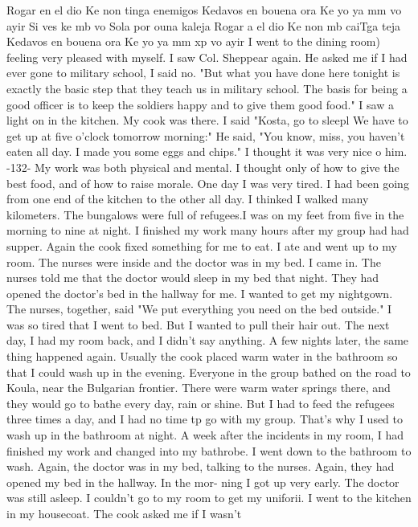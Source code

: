 Rogar en el dio 
Ke non tinga enemigos 
Kedavos en bouena ora 
Ke yo ya mm vo ayir 
Si ves ke mb vo 
Sola por ouna kaleja 
Rogar a el dio 
Ke non mb caiTga teja 
Kedavos en bouena ora 
Ke yo ya mm xp vo ayir 
I went to the dining room) feeling very pleased with myself.
I saw Col.
Sheppear 
again.
He asked me if I had ever gone to military school, I said no.
"But what you 
have done here tonight is exactly the basic step that they teach us in military 
school.
The basis for being a good officer is to keep the soldiers happy and to give 
them good food."
I saw a light on in the kitchen.
My cook was there.
I said "Kosta, go to sleepl 
We have to get up at five o'clock tomorrow morning:" He said, "You know, miss, you 
haven't eaten all day.
I made you some eggs and chips."
I thought it was very nice o 
him.
-132- 
My work was both physical and mental.
I thought only of how to give the best 
food, and of how to raise morale.
One day I was very tired.
I had been going from 
one end of the kitchen to the other all day.
I thinked I walked many kilometers.
The bungalows were full of refugees.I was on my feet from five in the morning to 
nine at night.
I finished my work many hours after my group had had supper.
Again 
the cook fixed something for me to eat.
I ate and went up to my room.
The nurses 
were inside and the doctor was in my bed.
I came in.
The nurses told me that the 
doctor would sleep in my bed that night.
They had opened the doctor's bed in the 
hallway for me.
I wanted to get my nightgown.
The nurses, together, said "We put everything you 
need on the bed outside."
I was so tired that I went to bed.
But I wanted to pull 
their hair out.
The next day, I had my room back, and I didn't say anything.
A few 
nights later, the same thing happened again.
Usually the cook placed warm water in the bathroom so that I could wash up in 
the evening.
Everyone in the group bathed on the road to Koula, near the Bulgarian 
frontier.
There were warm water springs there, and they would go to bathe every day, 
rain or shine.
But I had to feed the refugees three times a day, and I had no time 
tp go with my group.
That's why I used to wash up in the bathroom at night.
A week after the incidents in my room, I had finished my work and changed into 
my bathrobe.
I went down to the bathroom to wash.
Again, the doctor was in my bed, 
talking to the nurses.
Again, they had opened my bed in the hallway.
In the mor-
ning I got up very early.
The doctor was still asleep.
I couldn't go to my room to 
get my uniforii.
I went to the kitchen in my housecoat.
The cook asked me if I wasn't 
